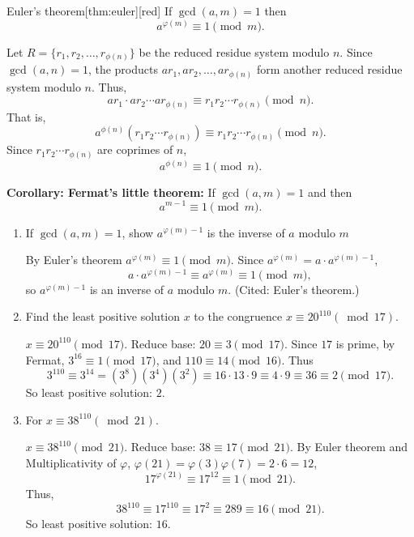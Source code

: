 \documentclass[11pt]{article}
\begin{document}
\begin{define}{Euler's theorem}[thm:euler][red]
  If $\gcd(a,m)=1$ then $$a^{\varphi(m)}\equiv1\pmod m.$$
  \begin{subprove}
    Let $R = \{ r_1, r_2, \dots, r_{\phi(n)} \}$ be the reduced residue system modulo $n$.
    Since $\gcd(a,n) = 1$, the products $a r_1, a r_2, \dots, a r_{\phi(n)}$ form another reduced residue system modulo $n$.
    Thus,
    \[
      a r_1 \cdot a r_2 \cdots a r_{\phi(n)} \equiv r_1 r_2 \cdots r_{\phi(n)} \pmod{n}.
    \]
    That is,
    \[
      a^{\phi(n)} (r_1 r_2 \cdots r_{\phi(n)}) \equiv r_1 r_2 \cdots r_{\phi(n)} \pmod{n}.
    \]
    Since $r_1 r_2 \cdots r_{\phi(n)}$ are coprimes of $n$, 
    \[
      a^{\phi(n)} \equiv 1 \pmod{n}.
    \]
  \end{subprove}
  \noindent\textbf{Corollary: Fermat's little theorem:} If $\gcd(a,m)=1$ and  then $$a^{m-1}\equiv1\pmod m.$$
\end{define}



\begin{enumerate}
  \item If $\gcd(a,m)=1$, show $a^{\varphi(m)-1}$ is the inverse of $a$ modulo $m$
  \begin{subprove}
    By Euler's theorem $a^{\varphi(m)}\equiv1\pmod m$. Since $a^{\varphi(m)}=a\cdot a^{\varphi(m)-1}$,
    \[a\cdot a^{\varphi(m)-1}\equiv a^{\varphi(m)}\equiv1\pmod m,
    \]
    so $a^{\varphi(m)-1}$ is an inverse of $a$ modulo $m$. (Cited: Euler's theorem.)
  \end{subprove}
  \item Find the least positive solution $x$ to the congruence $x \equiv 20^{110}(\bmod 17)$. 
    \begin{subanswer}
      $x\equiv20^{110}\pmod{17}$. Reduce base: $20\equiv3\pmod{17}$. Since $17$ is prime, by Fermat, $3^{16}\equiv1\pmod{17}$, and $110\equiv14\pmod{16}$. Thus
      \[3^{110}\equiv3^{14}=(3^8)(3^4)(3^2)\equiv16\cdot13\cdot9\equiv4\cdot9\equiv36\equiv2\pmod{17}.
      \]
      So least positive solution: $\boxed{2}$.
    \end{subanswer}
  \item For $x \equiv 38^{110}(\bmod 21)$.
    \begin{subanswer}
      $x\equiv38^{110}\pmod{21}$. Reduce base: $38\equiv17\pmod{21}$. 
      By Euler theorem and Multiplicativity of $\varphi$, $\varphi(21)=\varphi(3)\varphi(7)=2\cdot6=12$, 
      $$17^{\varphi(21)}\equiv17^{12}\equiv1\pmod{21}.$$
      Thus,
      \[38^{110}\equiv17^{110}\equiv17^2\equiv289\equiv16\pmod{21}.
      \]
      So least positive solution: $\boxed{16}$.
    \end{subanswer}
\end{enumerate}
\end{document}
